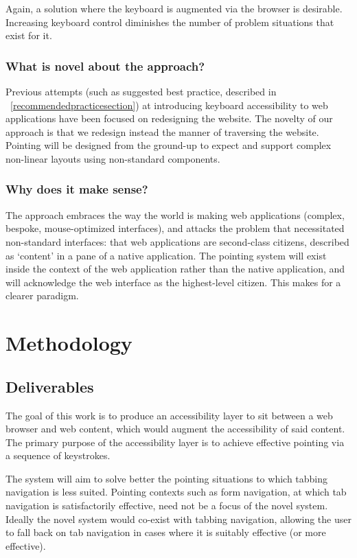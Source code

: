 \documentclass[11pt,openright,a4paper]{report}
\begin{document}
Again, a solution where the keyboard is augmented via the browser is desirable. Increasing keyboard control diminishes the number of problem situations that exist for it.

\subsubsection{What is novel about the approach?}
Previous attempts (such as suggested best practice, described in ~\cref{recommendedpracticesection}) at introducing keyboard accessibility to web applications have been focused on redesigning the website. The novelty of our approach is that we redesign instead the manner of traversing the website. Pointing will be designed from the ground-up to expect and support complex non-linear layouts using non-standard components.
\subsubsection{Why does it make sense?}
The approach embraces the way the world is making web applications (complex, bespoke, mouse-optimized interfaces), and attacks the problem that necessitated non-standard interfaces: that web applications are second-class citizens, described as `content' in a pane of a native application.
The pointing system will exist inside the context of the web application rather than the native application, and will acknowledge the web interface as the highest-level citizen. This makes for a clearer paradigm.
\section{Methodology}
\subsection{Deliverables}
The goal of this work is to produce an accessibility layer to sit between a web browser and web content, which would augment the accessibility of said content.
The primary purpose of the accessibility layer is to achieve effective pointing via a sequence of keystrokes.

The system will aim to solve better the pointing situations to which tabbing navigation is less suited. Pointing contexts such as form navigation, at which tab navigation is satisfactorily effective, need not be a focus of the novel system. Ideally the novel system would co-exist with tabbing navigation, allowing the user to fall back on tab navigation in cases where it is suitably effective (or more effective).
\end{document}
